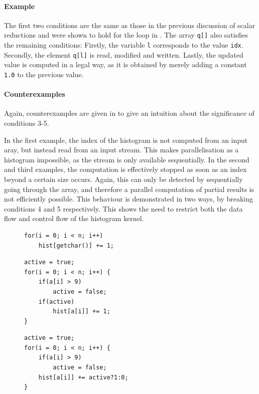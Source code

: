     \paragraph*{Example}
    The first two conditions are the same as those in the previous discussion of
    scalar reductions and were shown to hold for the loop in
    .
    The array \texttt{q[]} also satisfies the remaining conditions:
    Firstly, the variable \texttt{l} corresponds to the value \texttt{idx}.
    Secondly, the element \texttt{q[l]} is read, modified and written.
    Lastly, the updated value is computed in a legal way, as it is obtained by
    merely adding a constant \texttt{1.0} to the previous value.

    \paragraph*{Counterexamples}
    Again, counterexamples are given in  to give an
    intuition about the significance of conditions 3-5.

    In the first example, the index of the histogram is not computed from an
    input aray, but instead read from an input stream.
    This makes parallelisation as a histogram impossible, as the stream is only
    available sequentially.
    In the second and third examples, the computation is effectively stopped as
    soon as an index beyond a certain size occurs.
    Again, this can only be detected by sequentially going through the array,
    and therefore a parallel computation of partial results is not efficiently
    possible.
    This behaviour is demonstrated in two ways, by breaking conditions 4 and 5
    respectively.
    This shows the need to restrict both the data flow and control flow of the
    histogram kernel.

\begin{figure}[t]
\begin{lstlisting}[language=MyCpp]
for(i = 0; i < n; i++)
    hist[getchar()] += 1;
\end{lstlisting}
\begin{lstlisting}[language=MyCpp]
active = true;
for(i = 0; i < n; i++) {
    if(a[i] > 9)
        active = false;
    if(active)
        hist[a[i]] += 1;
}
\end{lstlisting}
\begin{lstlisting}[language=MyCpp,label={counterexamples2},caption=
   {Counterexamples to the last three conditions:
    None of these computations can be parallelised as histograms.
    The final two example loops implement the same functionality.}]
active = true;
for(i = 0; i < n; i++) {
    if(a[i] > 9)
        active = false;
    hist[a[i]] += active?1:0;
}
\end{lstlisting}
\end{figure}

